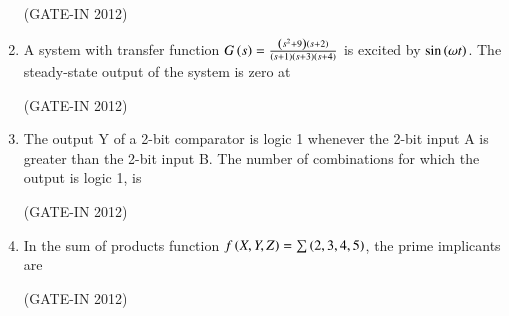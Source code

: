 \documentclass[journal,12pt,onecolumn]{IEEEtran}
\theoremstyle{remark}
\begin{document}
\begin{enumerate}
\hfill{(GATE-IN 2012)}
\begin{enumerate}
\end{enumerate}

\item A system with transfer function $G\left(s\right) = \frac{\left(s^2+9\right)\left(s+2\right)}{\left(s+1\right)\left(s+3\right)\left(s+4\right)}$ is excited by $\sin\left(\omega t\right)$. The steady-state output of the system is zero at

\hfill{(GATE-IN 2012)}
\begin{enumerate}
\end{enumerate}

\item The output Y of a 2-bit comparator is logic 1 whenever the 2-bit input A is greater than the 2-bit input B. The number of combinations for which the output is logic 1, is

\hfill{(GATE-IN 2012)}
\begin{enumerate}
\end{enumerate}

\item In the sum of products function $f\left(X, Y, Z\right) = \sum\left(2, 3, 4, 5\right)$, the prime implicants are

\hfill{(GATE-IN 2012)}
\begin{enumerate}
\end{enumerate}


\end{enumerate}
\end{document}
